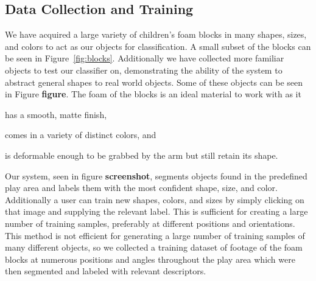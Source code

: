 \documentclass[11pt]{article}
\newcommand{\meh}[1]{{\bf \color{blue} #1}}
\begin{document}
\subsection{Data Collection and Training}
We have acquired a large variety of children's foam blocks in many shapes, sizes,
and colors to act as our objects for classification. A small subset of the
blocks can be seen in Figure~\ref{fig:blocks}. Additionally we have collected
more familiar objects to test our classifier on, demonstrating the ability of
the system to abstract general shapes to real world objects. Some of these
objects can be seen in Figure \meh{figure}. The foam of the blocks is an
ideal material to work with as it
\begin{inparaenum}[(1)]
\item has a smooth, matte finish,
\item comes in a variety of distinct colors, and
\item is deformable enough to be grabbed by the arm but still retain its
shape.
\end{inparaenum}


Our system, seen in figure \meh{screenshot}, segments objects found in the
predefined play area and labels them with the most confident shape, size, and
color.  Additionally a user can train new shapes, colors, and sizes by simply
clicking on that image and supplying the relevant label.  This is sufficient
for creating a large number of training samples, preferably at different
positions and orientations.  This method is not efficient for generating a
large number of training samples of many different objects, so we collected a
training dataset of footage of the foam blocks at numerous positions and angles
throughout the play area which were then segmented and labeled with relevant
descriptors.
\end{document}
